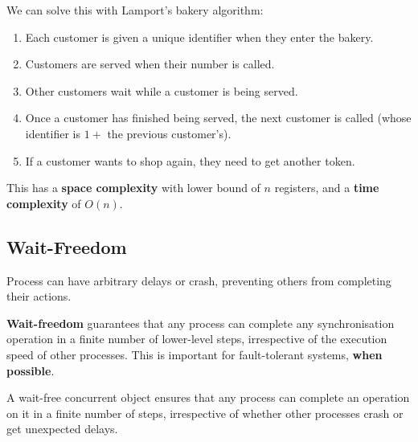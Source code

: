 \documentclass[11pt]{article}
\begin{document}
We can solve this with Lamport's bakery algorithm:
\begin{enumerate}
  \item Each customer is given a unique identifier when they enter the bakery.
  \item Customers are served when their number is called.
  \item Other customers wait while a customer is being served.
  \item Once a customer has finished being served, the next customer is called (whose identifier is $1 +$ the previous customer's).
  \item If a customer wants to shop again, they need to get another token.
\end{enumerate}

This has a \textbf{space complexity} with lower bound of $n$ registers, and a \textbf{time complexity} of $O(n)$.

\subsection{Wait-Freedom}
Process can have arbitrary delays or crash, preventing others from completing their actions.

\textbf{Wait-freedom} guarantees that any process can complete any synchronisation operation in a finite number of lower-level steps, irrespective of the execution speed of other processes.
This is important for fault-tolerant systems, \textbf{when possible}.

A wait-free concurrent object ensures that any process can complete an operation on it in a finite number of steps, irrespective of whether other processes crash or get unexpected delays.
\end{document}
